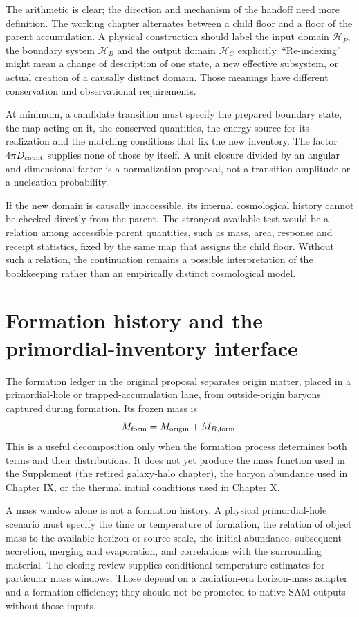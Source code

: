 The arithmetic is clear; the direction and mechanism of the handoff need more definition. The working chapter alternates between a child floor and a floor of the parent accumulation. A physical construction should label the input domain $\mathcal H_P$, the boundary system $\mathcal H_B$ and the output domain $\mathcal H_C$ explicitly. ``Re-indexing'' might mean a change of description of one state, a new effective subsystem, or actual creation of a causally distinct domain. Those meanings have different conservation and observational requirements.

At minimum, a candidate transition must specify the prepared boundary state, the map acting on it, the conserved quantities, the energy source for its realization and the matching conditions that fix the new inventory. The factor $4\pi D_{\rm count}$ supplies none of those by itself. A unit closure divided by an angular and dimensional factor is a normalization proposal, not a transition amplitude or a nucleation probability.

If the new domain is causally inaccessible, its internal cosmological history cannot be checked directly from the parent. The strongest available test would be a relation among accessible parent quantities, such as mass, area, response and receipt statistics, fixed by the same map that assigns the child floor. Without such a relation, the continuation remains a possible interpretation of the bookkeeping rather than an empirically distinct cosmological model.

\section{Formation history and the primordial-inventory interface}
The formation ledger in the original proposal separates origin matter, placed in a primordial-hole or trapped-accumulation lane, from outside-origin baryons captured during formation. Its frozen mass is
\begin{equation}
 M_{\rm form}=M_{\rm origin}+M_{B,\rm form}.
 \label{c12:formationinventory}
\end{equation}
This is a useful decomposition only when the formation process determines both terms and their distributions. It does not yet produce the mass function used in the Supplement (the retired galaxy-halo chapter), the baryon abundance used in Chapter IX, or the thermal initial conditions used in Chapter X.

A mass window alone is not a formation history. A physical primordial-hole scenario must specify the time or temperature of formation, the relation of object mass to the available horizon or source scale, the initial abundance, subsequent accretion, merging and evaporation, and correlations with the surrounding material. The closing review supplies conditional temperature estimates for particular mass windows. Those depend on a radiation-era horizon-mass adapter and a formation efficiency; they should not be promoted to native SAM outputs without those inputs.


